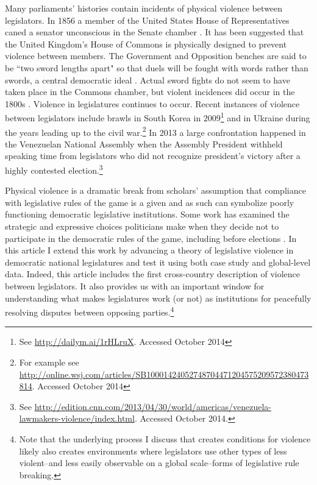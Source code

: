 \documentclass[a4paper]{article}\usepackage[]{graphicx}\usepackage[]{color}
\begin{document}
Many parliaments' histories contain incidents of physical violence between legislators. In 1856 a member of the United States House of Representatives caned a senator unconscious in the Senate chamber \citep{USSenateCanning}. It has been suggested that the United Kingdom's House of Commons is physically designed to prevent violence between members. The Government and Opposition benches are said to be ``two sword lengths apart" \citep{ParliamentUKSword} so that duels will be fought with words rather than swords, a central democratic ideal \cite[220]{Schwarzmantel2010}. Actual sword fights do not seem to have taken place in the Commons chamber, but violent incidences did occur in the 1800s \citep[]{ByrneViolence}. Violence in legislatures continues to occur. Recent instances of violence between legislators include brawls in South Korea in 2009\footnote{See \url{http://dailym.ai/1rHLruX}. Accessed October 2014} and in Ukraine during the years leading up to the civil war.\footnote{For example see \url{http://online.wsj.com/articles/SB10001424052748704471204575209572380473814}. Accessed October 2014} In 2013 a large confrontation happened in the Venezuelan National Assembly when the Assembly President withheld speaking time from legislators who did not recognize president's victory after a highly contested election.\footnote{See \url{http://edition.cnn.com/2013/04/30/world/americas/venezuela-lawmakers-violence/index.html}. Accessed October 2014.}

Physical violence is a dramatic break from scholars' assumption that compliance with legislative rules of the game is a given and as such can symbolize poorly functioning democratic legislative institutions. Some work has examined the strategic and expressive choices politicians make when they decide not to participate in the democratic rules of the game, including before elections \citep{wilkinson2006,Beaulieu2008,BeaulieuForthcoming}. In this article I extend this work by advancing a theory of legislative violence in democratic national legislatures and test it using both case study and global-level data. Indeed, this article includes the first cross-country description of violence between legislators. It also provides us with an important window for understanding what makes legislatures work (or not) as institutions for peacefully resolving disputes between opposing parties.\footnote{Note that the underlying process I discuss that creates conditions for violence likely also creates environments where legislators use other types of less violent--and less easily observable on a global scale--forms of legislative rule breaking.}
\end{document}
